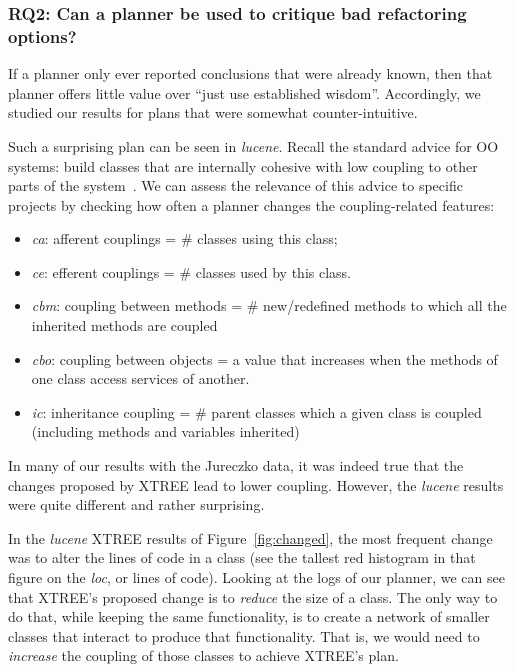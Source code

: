 \documentclass{sig-alternate}
\newcommand{\bi}{\begin{itemize}}
\newcommand{\ei}{\end{itemize}}
\newcommand{\fig}[1]{Figure~\ref{fig:#1}}
\begin{document}
{\begin{itemize}[leftmargin=3mm]


\subsubsection{RQ2: Can a planner be used to critique bad refactoring options?}\label{sect:surprise}

If a planner only ever reported conclusions that were already known, then that planner offers
little value over ``just use established wisdom''. Accordingly, we studied our results
for plans that were somewhat counter-intuitive. 

Such a surprising plan can be  seen in {\em lucene}. Recall the standard advice for
OO systems: build classes that are internally cohesive with low coupling to other parts of the system~\cite{Dhama199565}. We can assess the relevance of this advice
to specific projects by checking how often a planner changes the
 coupling-related features:
\bi
\item {\em ca}:   afferent couplings  =  \# classes using this
				class;
\item {\em  	ce}:  efferent couplings =  \# classes  used by this
				  class. 
\item {\em cbm}: coupling between methods =  \# new/redefined methods
				to which all the inherited methods are coupled
\item	{\em cbo}:  coupling between objects = a value that increases when the methods of one
				class access services of another.
 
\item {\em ic}:   inheritance coupling =  \# parent classes  which a given
				class is coupled (including methods and variables inherited)
\ei
In many of our results with the Jureczko data, it was indeed true that the changes
proposed by XTREE lead to lower coupling. However, the {\em lucene} results were quite
different and rather surprising.

In the {\em lucene} XTREE results  of  \fig{changed},
the most frequent change was to alter the lines of code in a class (see the tallest
red histogram in that figure on the {\em loc}, or lines of code). 
Looking at the logs of our planner, we can see
that XTREE's proposed change is to {\em reduce} the size of a class.
The only way to do that,  while keeping the  same functionality, is to create a network
of smaller classes that interact to produce that functionality.
That is, we would need to {\em increase} the coupling of those classes to achieve XTREE's plan.


\end{itemize}}
\end{document}
